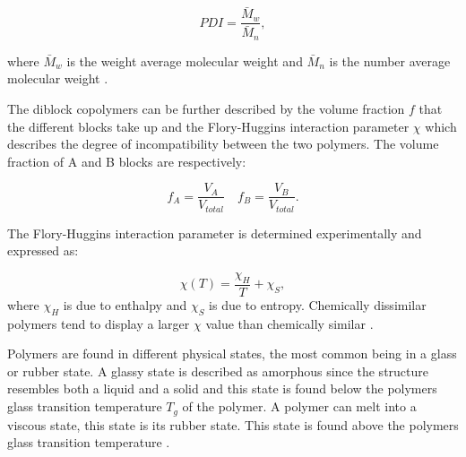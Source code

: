 \documentclass[MasterThesisMain.tex]{subfiles}
\begin{document}
\begin{equation}
PDI = \frac{\bar{M}_w}{\bar{M}_n},
\end{equation} 

where $\bar{M}_w$ is the weight average molecular weight and $\bar{M}_n$ is the number average molecular weight \cite{strobl2007physics}.

The diblock copolymers can be further described by the volume fraction $f$ that the different blocks take up and the Flory-Huggins interaction parameter $\chi$ which describes the degree of incompatibility between the two polymers. The volume fraction of A and B blocks are respectively:

\begin{equation}
f_A = \frac{V_A}{V_{total}} \quad f_B=\frac{V_B}{V_{total}}.
\end{equation}

The Flory-Huggins interaction parameter is determined experimentally and expressed as:

\begin{equation}
\chi(T) = \frac{\chi_H}{T} + \chi_S,
\end{equation} 
where $\chi_H$ is due to enthalpy and $\chi_S$ is due to entropy. Chemically dissimilar polymers tend to display a larger $\chi$ value than chemically similar \cite{BCPthermo}\cite{FHpolymer}.

Polymers are found in different physical states, the most common being in a glass or rubber state. A glassy state is described as amorphous since the structure resembles both a liquid and a solid and this state is found below the polymers glass transition temperature $T_g$ of the polymer. A polymer can melt into a viscous state, this state is its rubber state. This state is found above the polymers glass transition temperature \cite{petty2008molecular}. 
\end{document}
